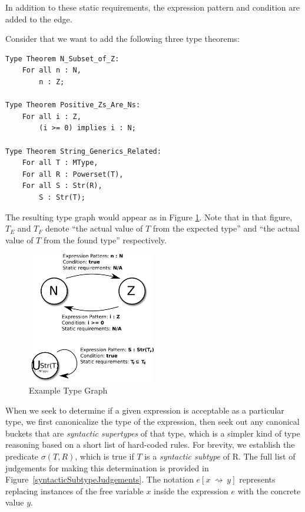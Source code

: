 In addition to these static requirements, the expression pattern and condition are added to the edge.

Consider that we want to add the following three type theorems:

\begin{lstlisting}
Type Theorem N_Subset_of_Z:
	For all n : N,
		n : Z;

Type Theorem Positive_Zs_Are_Ns:
	For all i : Z,
		(i >= 0) implies i : N;

Type Theorem String_Generics_Related:
	For all T : MType,
	For all R : Powerset(T),
	For all S : Str(R),
		S : Str(T);
\end{lstlisting}

The resulting type graph would appear as in Figure \ref{typeGraph}.  Note that in that figure, $T_E$ and $T_F$ denote ``the actual value of $T$ from the expected type'' and ``the actual value of $T$ from the found type'' respectively.

\begin{figure}
  \centering
    \includegraphics[width=0.5\textwidth]{typeGraph}
  \caption{Example Type Graph\label{typeGraph}}
\end{figure}

When we seek to determine if a given expression is acceptable as a particular type, we first canonicalize the type of the expression, then seek out any canonical buckets that are \emph{syntactic supertypes} of that type, which is a simpler kind of type reasoning based on a short list of hard-coded rules.  For brevity, we establish the predicate $\sigma(T, R)$, which is true if $T$ is a \emph{syntactic subtype} of R.  The full list of judgements for making this determination is provided in Figure~\ref{syntacticSubtypeJudgements}.  The notation $e[x~\rightsquigarrow~y]$ represents replacing instances of the free variable $x$ inside the expression $e$ with the concrete value $y$.


